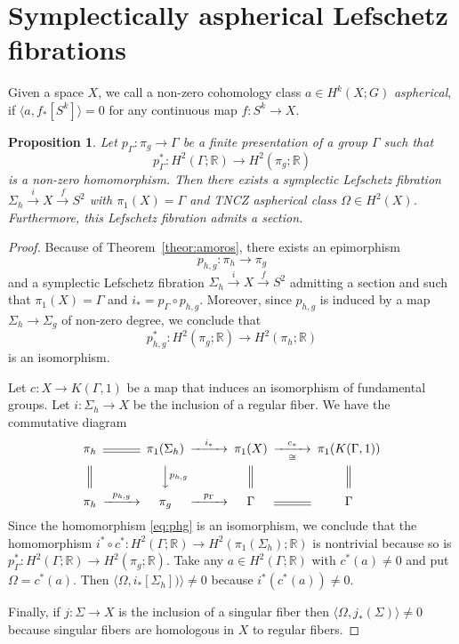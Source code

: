 \documentclass[12pt]{amsart}
\newcommand{\B}[1]{{\mathbb #1}}
\newcommand{\R}{\B R}
\newtheorem{proposition}[subsection]{Proposition}
\theoremstyle{definition}
\theoremstyle{remark}
\numberwithin{figure}{section}
\numberwithin{table}{section}
\numberwithin{equation}{section}
\newcommand{\Om}{{\Omega}}
\newcommand{\Ga}{{\Gamma}}
\newcommand{\Si}{{\Sigma}}
\def\pg{p_{\Ga}}
\newcommand\theoref{Theorem~\ref}
\begin{document}
 


 




\section{Symplectically aspherical Lefschetz fibrations}\label{S:salf} 



Given a space $X$, we call a non-zero cohomology class $a\in H^k(X;G)$  {\em aspherical}, 
if $\langle a,f_*[S^k]\rangle=0$ for any continuous map $f:S^k\to X$. 

\begin{proposition}\label{P:fac} 
Let $p_{\Ga}: \pi_g\to \Ga $ be a finite presentation of a group $\Ga$ such 
that 
$$
\pg^*: H^2(\Ga;\R)\to H^2(\pi_g;\R)
$$ is a non-zero homomorphism.
Then there exists a symplectic Lefschetz fibration 
$\Sigma_h\stackrel{i}\to X \stackrel{f}\to S^2$ with $\pi_1(X)=\Ga$ 
and TNCZ aspherical class $\Om\in H^2(X)$. Furthermore, this Lefschetz fibration admits a section.
\end{proposition} 

\begin{proof}
Because of \theoref{theor:amoros}, there exists an epimorphism 
$$
p_{h,g}:\pi_h \to \pi_g
$$
and a symplectic Lefschetz fibration $\Si_h\stackrel{i}\to X \stackrel{f}\to 
S^2$ admitting a section and such that $\pi_1(X)=\Ga$ and $i_* = p_{\Ga}\circ p_{h,g}$. Moreover, since $p_{h,g}$ is induced by a map $\Sigma_h \to \Sigma_g$ of non-zero degree, we conclude that  
%
\begin{equation}\label{eq:phg}
p_{h,g}^*: H^2(\pi_g; \R) \rightarrow H^2(\pi_h;\R)
\end{equation}
%
is an isomorphism. 

Let $c: X\to K(\Ga,1)$ be a map that induces an isomorphism of fundamental 
groups.  Let $i: \Si_h \to X$ be the inclusion of a regular fiber. We have the 
commutative diagram
$$
\CD
\pi_h @=\pi_1(\Si_h)@>i_*>>\pi_1(X) @>c_*>\cong >\pi_1(K(\Ga,1))\\
@| @VVp_{h,g}V @| @| \\
\pi_h @>p_{h,g}>> \pi_g @>p_{\Ga}>> \Ga @=\Ga
\endCD
$$
Since the homomorphism \eqref{eq:phg} is an isomorphism, we conclude that the homomorphism $i^*\circ c^*:H^2(\Ga; \R) \to H^2(\pi_1(\Si_h);\R)$ is nontrivial because so is $p_{\Ga}^*: H^2(\Ga; \R)\to H^2(\pi_g; \R)$. Take any $a\in H^2(\Ga;\R)$ with $c^*(a)\ne 0$ and put $\Omega=c^*(a)$. Then $\langle \Omega, i_*[\Si_h])\rangle \ne 0$ because $i^*( c^*(a))\ne 0$.

Finally, if $j: \Si \to X$ is the inclusion of a singular fiber then $\langle \Omega, j_*(\Si)\rangle \ne 0$ because singular fibers are homologous in $X$ to regular fibers.
\end{proof} 
\end{document}
